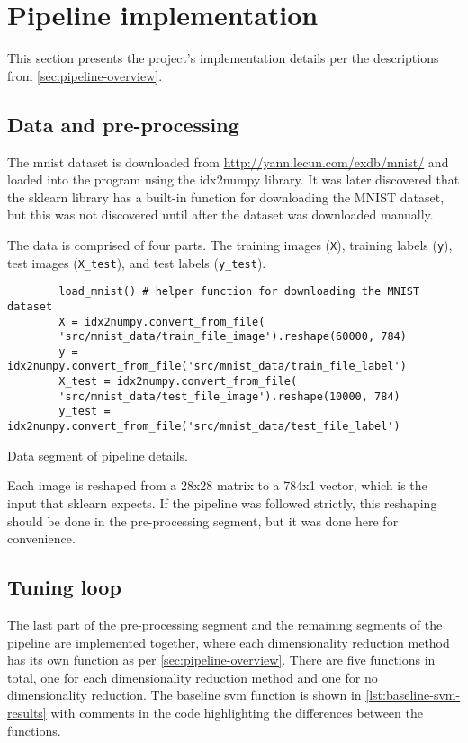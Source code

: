 \section{Pipeline implementation}\label{sec:pipeline-implementation}
This section presents the project's implementation details per the descriptions from \autoref{sec:pipeline-overview}.

\subsection{Data and pre-processing}\label{subsec:data-and-pre-processing}
The \gls{mnist} dataset is downloaded from \url{http://yann.lecun.com/exdb/mnist/}\cite{lecun-mnist-database} and loaded into the program using the idx2numpy library. It was later discovered that the \gls{sklearn} library has a built-in function for downloading the MNIST dataset, but this was not discovered until after the dataset was downloaded manually.

The data is comprised of four parts. The training images (\texttt{X}), training labels (\texttt{y}), test images (\texttt{X\_test}), and test labels (\texttt{y\_test}).


\begin{listing}[htb!]
    \centering
    \begin{verbatim}
        load_mnist() # helper function for downloading the MNIST dataset
        X = idx2numpy.convert_from_file(
        'src/mnist_data/train_file_image').reshape(60000, 784)
        y = idx2numpy.convert_from_file('src/mnist_data/train_file_label')
        X_test = idx2numpy.convert_from_file(
        'src/mnist_data/test_file_image').reshape(10000, 784)
        y_test = idx2numpy.convert_from_file('src/mnist_data/test_file_label')
    \end{verbatim}
    \caption{Data segment of pipeline details.}
    \label{lst:data-segment}
\end{listing}


Each image is reshaped from a 28x28 matrix to a 784x1 vector, which is the input that \gls{sklearn} expects. If the pipeline was followed strictly, this reshaping should be done in the pre-processing segment, but it was done here for convenience.

\subsection{Tuning loop}\label{subsec:tuning-loop}
The last part of the pre-processing segment and the remaining segments of the pipeline are implemented together, where each dimensionality reduction method has its own function as per \autoref{sec:pipeline-overview}. There are five functions in total, one for each dimensionality reduction method and one for no dimensionality reduction. The baseline \gls{svm} function is shown in \autoref{lst:baseline-svm-results} with comments in the code highlighting the differences between the functions.


